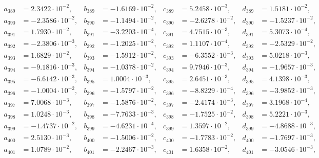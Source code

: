 \begin{align*}
  a_{ 389 } &= 2.3422 \cdot 10^{ -2 }, & b_{ 389 } &= -1.6169 \cdot 10^{ -2 }, & c_{ 389 } &= 5.2458 \cdot 10^{ -3 }, & d_{ 389 } &= 1.5181 \cdot 10^{ -2 }, \\ 
  a_{ 390 } &= -2.3586 \cdot 10^{ -2 }, & b_{ 390 } &= -1.1494 \cdot 10^{ -2 }, & c_{ 390 } &= -2.6278 \cdot 10^{ -2 }, & d_{ 390 } &= -1.5237 \cdot 10^{ -2 }, \\ 
  a_{ 391 } &= 1.7930 \cdot 10^{ -2 }, & b_{ 391 } &= -3.2203 \cdot 10^{ -4 }, & c_{ 391 } &= 4.7515 \cdot 10^{ -3 }, & d_{ 391 } &= 5.3073 \cdot 10^{ -4 }, \\ 
  a_{ 392 } &= -2.3806 \cdot 10^{ -3 }, & b_{ 392 } &= -1.2025 \cdot 10^{ -2 }, & c_{ 392 } &= 1.1107 \cdot 10^{ -4 }, & d_{ 392 } &= -2.5329 \cdot 10^{ -2 }, \\ 
  a_{ 393 } &= 1.6829 \cdot 10^{ -2 }, & b_{ 393 } &= -1.5912 \cdot 10^{ -2 }, & c_{ 393 } &= -6.3552 \cdot 10^{ -3 }, & d_{ 393 } &= 5.0218 \cdot 10^{ -3 }, \\ 
  a_{ 394 } &= -9.1816 \cdot 10^{ -3 }, & b_{ 394 } &= -1.0378 \cdot 10^{ -2 }, & c_{ 394 } &= 9.7946 \cdot 10^{ -3 }, & d_{ 394 } &= -1.9657 \cdot 10^{ -3 }, \\ 
  a_{ 395 } &= -6.6142 \cdot 10^{ -3 }, & b_{ 395 } &= 1.0004 \cdot 10^{ -3 }, & c_{ 395 } &= 2.6451 \cdot 10^{ -3 }, & d_{ 395 } &= 4.1398 \cdot 10^{ -3 }, \\ 
  a_{ 396 } &= -1.0004 \cdot 10^{ -2 }, & b_{ 396 } &= -1.5797 \cdot 10^{ -2 }, & c_{ 396 } &= -8.8229 \cdot 10^{ -4 }, & d_{ 396 } &= -3.9852 \cdot 10^{ -3 }, \\ 
  a_{ 397 } &= 7.0068 \cdot 10^{ -3 }, & b_{ 397 } &= -1.5876 \cdot 10^{ -2 }, & c_{ 397 } &= -2.4174 \cdot 10^{ -3 }, & d_{ 397 } &= 3.1968 \cdot 10^{ -4 }, \\ 
  a_{ 398 } &= 1.0248 \cdot 10^{ -3 }, & b_{ 398 } &= -7.7633 \cdot 10^{ -3 }, & c_{ 398 } &= -1.7525 \cdot 10^{ -2 }, & d_{ 398 } &= 5.2221 \cdot 10^{ -3 }, \\ 
  a_{ 399 } &= -1.4737 \cdot 10^{ -2 }, & b_{ 399 } &= -4.6231 \cdot 10^{ -4 }, & c_{ 399 } &= 1.3597 \cdot 10^{ -2 }, & d_{ 399 } &= -4.8688 \cdot 10^{ -3 }, \\ 
  a_{ 400 } &= 2.5130 \cdot 10^{ -3 }, & b_{ 400 } &= -1.5006 \cdot 10^{ -2 }, & c_{ 400 } &= -1.7783 \cdot 10^{ -2 }, & d_{ 400 } &= -1.7697 \cdot 10^{ -3 }, \\ 
  a_{ 401 } &= 1.0789 \cdot 10^{ -2 }, & b_{ 401 } &= -2.2467 \cdot 10^{ -3 }, & c_{ 401 } &= 1.6358 \cdot 10^{ -2 }, & d_{ 401 } &= -3.0546 \cdot 10^{ -3 }, \\ 

\end{align*}
